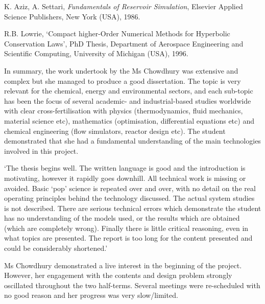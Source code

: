 \documentclass[14pt,twoside]{report}
\begin{document}
\begin{description}
\begin{enumerate}
\begin{enumerate}[label={[\arabic*]}]
\item K. Aziz, A. Settari, {\it Fundamentals of Reservoir Simulation}, Elsevier Applied Science Publishers, New York (USA), 1986.
\item R.B. Lowrie, `Compact higher-Order Numerical Methods for Hyperbolic Conservation Laws', PhD Thesis, Department of Aerospace Engineering and Scientific Computing, University of Michigan (USA), 1996.
\end{enumerate}
% 
\end{enumerate}
In summary, the work undertook by the Ms Chowdhury was extensive and complex but she managed to produce a good dissertation. The topic is very relevant for the chemical, energy and environmental sectors, and each sub-topic has been the focus of several academic- and industrial-based studies worldwide with clear cross-fertilisation with physics (thermodynamics, fluid mechanics, material science etc), mathematics (optimisation, differential equations etc) and chemical engineering (flow simulators, reactor design etc). The student demonstrated that she had a fundamental understanding of the main technologies involved in this project.

\item[Examiner 2:] `The thesis begins well. The written language is good and the introduction is motivating, however it rapidly goes downhill. All technical work is missing or avoided. Basic `pop' science is repeated over and over, with no detail on the real operating principles behind the technology discussed. The actual system studies is not described. There are serious technical errors which demonstrate the student has no understanding of the models used, or the results which are obtained (which are completely wrong). Finally there is little critical reasoning, even in what topics are presented. The report is too long for the content presented and could be considerably shortened.'
%
\item[Comments -re Conduct:] Ms Chowdhury demonstrated a live interest in the beginning of the project. However, her engagement with the contents and design problem strongly oscillated throughout the two half-terms. Several meetings were re-scheduled with no good reason and her progress was very slow/limited. 

\end{description}
\clearpage



\end{document}
